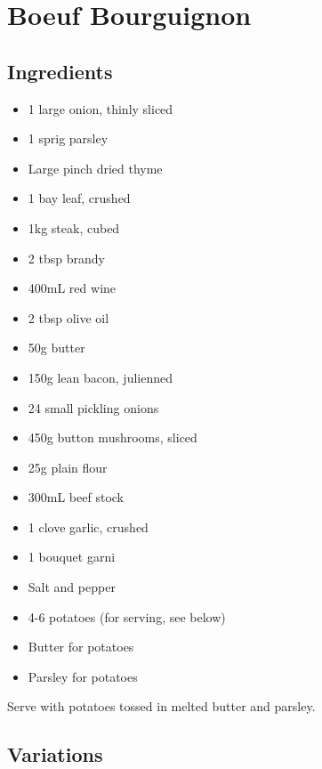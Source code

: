 \clearpage
\section{Boeuf Bourguignon}


  \begin{multicols}{2}
    \subsection{Ingredients}
      \begin{itemize}[noitemsep]
        \item 1 large onion, thinly sliced
        \item 1 sprig parsley
        \item Large pinch dried thyme
        \item 1 bay leaf, crushed
        \item 1kg steak, cubed
        \item 2 tbsp brandy
        \item 400mL red wine
        \item 2 tbsp olive oil
        \item 50g butter
        \item 150g lean bacon, julienned
        \item 24 small pickling onions
        \item 450g button mushrooms, sliced
        \item 25g plain flour
        \item 300mL beef stock
        \item 1 clove garlic, crushed
        \item 1 bouquet garni
        \item Salt and pepper
        \item 4-6 potatoes (for serving, see below)
        \item Butter for potatoes
        \item Parsley for potatoes
      \end{itemize}

      Serve with potatoes tossed in melted butter and parsley.

      \subsection{Variations}

\end{multicols}
